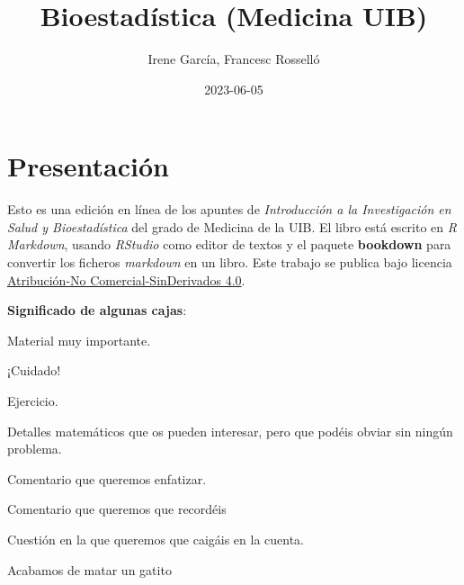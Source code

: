 \documentclass[
]{book}
\title{Bioestadística (Medicina UIB)}
\author{Irene García, Francesc Rosselló}
\date{2023-06-05}
\theoremstyle{definition}
\theoremstyle{definition}
\theoremstyle{definition}
\theoremstyle{definition}
\theoremstyle{remark}
\begin{document}
\maketitle

{
\setcounter{tocdepth}{1}
\tableofcontents
}
\hypertarget{presentaciuxf3n}{%
\chapter*{Presentación}\label{presentaciuxf3n}}

Esto es una edición en línea de los apuntes de \emph{Introducción a la Investigación en Salud y Bioestadística} del grado de Medicina de la UIB. El libro está escrito en \emph{R Markdown}, usando \emph{RStudio} como editor de textos y el paquete \textbf{bookdown} para convertir los ficheros \emph{markdown} en un libro. Este trabajo se publica bajo licencia \href{https://creativecommons.org/licenses/by-nc-nd/4.0/}{Atribución-No Comercial-SinDerivados 4.0}.

\textbf{Significado de algunas cajas}:

\begin{rmdimportant}
Material muy importante.
\end{rmdimportant}

\begin{rmdcaution}
¡Cuidado!
\end{rmdcaution}

\begin{rmdexercici}
Ejercicio.
\end{rmdexercici}

\begin{rmdcorbes}
Detalles matemáticos que os pueden interesar, pero que podéis obviar sin ningún problema.
\end{rmdcorbes}

\begin{rmdnote}
Comentario que queremos enfatizar.
\end{rmdnote}

\begin{rmdrecordau}
Comentario que queremos que recordéis
\end{rmdrecordau}

\begin{rmdromans}
Cuestión en la que queremos que caigáis en la cuenta.
\end{rmdromans}

\begin{rmderrorpetit}
Acabamos de matar un gatito
\end{rmderrorpetit}
\end{document}
